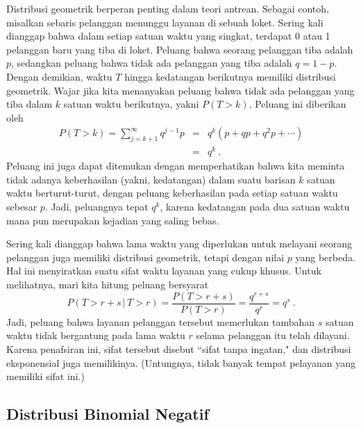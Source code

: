\begin{example}\label{exam 5.1}
Distribusi geometrik berperan penting dalam teori antrean. Sebagai contoh,
misalkan sebaris pelanggan menunggu layanan di sebuah loket. Sering kali dianggap bahwa
dalam setiap satuan waktu yang singkat, terdapat 0 atau 1 pelanggan baru yang tiba di
loket. Peluang bahwa seorang pelanggan tiba adalah $p$, sedangkan peluang bahwa tidak ada
pelanggan yang tiba adalah $q = 1 - p$. Dengan demikian, waktu $T$ hingga kedatangan
berikutnya memiliki distribusi geometrik. Wajar jika kita menanyakan peluang bahwa tidak
ada pelanggan yang tiba dalam $k$ satuan waktu berikutnya, yakni $P(T > k)$. Peluang ini
diberikan oleh
\begin{eqnarray*} P(T > k) = \sum_{j = k+1}^\infty q^{j-1}p & = & q^k(p + qp + q^2p + \cdots)
\\
                                    & = & q^k\ .
\end{eqnarray*} Peluang ini juga dapat ditemukan dengan memperhatikan bahwa kita meminta
tidak adanya keberhasilan (yakni, kedatangan) dalam suatu barisan $k$ satuan waktu
berturut-turut, dengan peluang keberhasilan pada setiap satuan waktu sebesar $p$. Jadi,
peluangnya tepat $q^k$, karena kedatangan pada dua satuan waktu mana pun merupakan
kejadian yang saling bebas.
\par
Sering kali dianggap bahwa lama waktu yang diperlukan untuk melayani seorang pelanggan
juga memiliki distribusi geometrik, tetapi dengan nilai $p$ yang berbeda. Hal ini
menyiratkan suatu sifat waktu layanan yang cukup khusus. Untuk melihatnya, mari kita
hitung peluang bersyarat
$$ P(T > r + s\,|\,T > r) = \frac{P(T > r + s)}{P(T > r)} = \frac {q^{r + s}}{q^r} =
q^s\ .
$$ 
Jadi, peluang bahwa layanan pelanggan tersebut memerlukan tambahan $s$ satuan waktu tidak
bergantung pada lama waktu $r$ selama pelanggan itu telah dilayani. Karena penafsiran ini,
sifat tersebut disebut ``sifat tanpa ingatan," dan distribusi eksponensial juga
memilikinya. (Untungnya, tidak banyak tempat pelayanan yang memiliki sifat ini.)
\end{example}

\subsection*{Distribusi Binomial Negatif}

